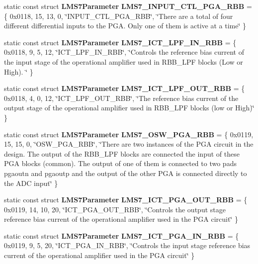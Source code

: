 \begin{DoxyCompactItemize}
\item 
static const struct {\bf L\+M\+S7\+Parameter} {\bf L\+M\+S7\+\_\+\+I\+N\+P\+U\+T\+\_\+\+C\+T\+L\+\_\+\+P\+G\+A\+\_\+\+R\+BB} = \{ 0x0118, 15, 13, 0, \char`\"{}\+I\+N\+P\+U\+T\+\_\+\+C\+T\+L\+\_\+\+P\+G\+A\+\_\+\+R\+B\+B\char`\"{}, \char`\"{}\+There are a total of four different differential inputs to the P\+G\+A. Only one of them is active at a time\char`\"{} \}
\item 
static const struct {\bf L\+M\+S7\+Parameter} {\bf L\+M\+S7\+\_\+\+I\+C\+T\+\_\+\+L\+P\+F\+\_\+\+I\+N\+\_\+\+R\+BB} = \{ 0x0118, 9, 5, 12, \char`\"{}\+I\+C\+T\+\_\+\+L\+P\+F\+\_\+\+I\+N\+\_\+\+R\+B\+B\char`\"{}, \char`\"{}\+Controls the reference bias current of the input stage of the operational amplifier used in R\+B\+B\+\_\+\+L\+P\+F blocks (\+Low or High). \char`\"{} \}
\item 
static const struct {\bf L\+M\+S7\+Parameter} {\bf L\+M\+S7\+\_\+\+I\+C\+T\+\_\+\+L\+P\+F\+\_\+\+O\+U\+T\+\_\+\+R\+BB} = \{ 0x0118, 4, 0, 12, \char`\"{}\+I\+C\+T\+\_\+\+L\+P\+F\+\_\+\+O\+U\+T\+\_\+\+R\+B\+B\char`\"{}, \char`\"{}\+The reference bias current of the output stage of the operational amplifier used in R\+B\+B\+\_\+\+L\+P\+F blocks (low or High)\char`\"{} \}
\item 
static const struct {\bf L\+M\+S7\+Parameter} {\bf L\+M\+S7\+\_\+\+O\+S\+W\+\_\+\+P\+G\+A\+\_\+\+R\+BB} = \{ 0x0119, 15, 15, 0, \char`\"{}\+O\+S\+W\+\_\+\+P\+G\+A\+\_\+\+R\+B\+B\char`\"{}, \char`\"{}\+There are two instances of the P\+G\+A circuit in the design. The output of the R\+B\+B\+\_\+\+L\+P\+F blocks are connected the input of these P\+G\+A blocks (common). The output of one of them is connected to two pads pgaoutn and pgaoutp and the output of the other P\+G\+A is connected directly to the A\+D\+C input\char`\"{} \}
\item 
static const struct {\bf L\+M\+S7\+Parameter} {\bf L\+M\+S7\+\_\+\+I\+C\+T\+\_\+\+P\+G\+A\+\_\+\+O\+U\+T\+\_\+\+R\+BB} = \{ 0x0119, 14, 10, 20, \char`\"{}\+I\+C\+T\+\_\+\+P\+G\+A\+\_\+\+O\+U\+T\+\_\+\+R\+B\+B\char`\"{}, \char`\"{}\+Controls the output stage reference bias current of the operational amplifier used in the P\+G\+A circuit\char`\"{} \}
\item 
static const struct {\bf L\+M\+S7\+Parameter} {\bf L\+M\+S7\+\_\+\+I\+C\+T\+\_\+\+P\+G\+A\+\_\+\+I\+N\+\_\+\+R\+BB} = \{ 0x0119, 9, 5, 20, \char`\"{}\+I\+C\+T\+\_\+\+P\+G\+A\+\_\+\+I\+N\+\_\+\+R\+B\+B\char`\"{}, \char`\"{}\+Controls the input stage reference bias current of the operational amplifier used in the P\+G\+A circuit\char`\"{} \}

\end{DoxyCompactItemize}
